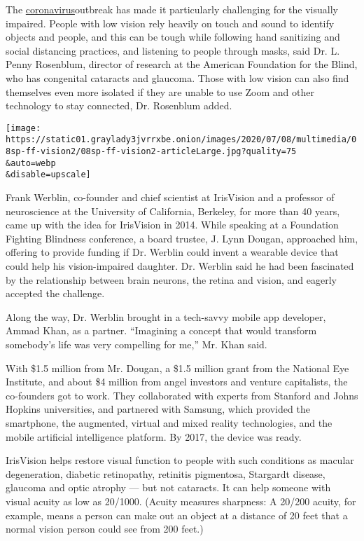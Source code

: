 The
\href{https://www.nytimes3xbfgragh.onion/news-event/coronavirus}{coronavirus}outbreak
has made it particularly challenging for the visually impaired. People
with low vision rely heavily on touch and sound to identify objects and
people, and this can be tough while following hand sanitizing and social
distancing practices, and listening to people through masks, said Dr. L.
Penny Rosenblum, director of research at the American Foundation for the
Blind, who has congenital cataracts and glaucoma. Those with low vision
can also find themselves even more isolated if they are unable to use
Zoom and other technology to stay connected, Dr. Rosenblum added.

\texttt{[image: https://static01.graylady3jvrrxbe.onion/images/2020/07/08/multimedia/08sp-ff-vision2/08sp-ff-vision2-articleLarge.jpg?quality=75\\\&auto=webp\\\&disable=upscale]}

Frank Werblin, co-founder and chief scientist at IrisVision and a
professor of neuroscience at the University of California, Berkeley, for
more than 40 years, came up with the idea for IrisVision in 2014. While
speaking at a Foundation Fighting Blindness conference, a board trustee,
J. Lynn Dougan, approached him, offering to provide funding if Dr.
Werblin could invent a wearable device that could help his
vision-impaired daughter. Dr. Werblin said he had been fascinated by the
relationship between brain neurons, the retina and vision, and eagerly
accepted the challenge.

Along the way, Dr. Werblin brought in a tech-savvy mobile app developer,
Ammad Khan, as a partner. ``Imagining a concept that would transform
somebody's life was very compelling for me,'' Mr. Khan said.

With \$1.5 million from Mr. Dougan, a \$1.5 million grant from the
National Eye Institute, and about \$4 million from angel investors and
venture capitalists, the co-founders got to work. They collaborated with
experts from Stanford and Johns Hopkins universities, and partnered with
Samsung, which provided the smartphone, the augmented, virtual and mixed
reality technologies, and the mobile artificial intelligence platform.
By 2017, the device was ready.

IrisVision helps restore visual function to people with such conditions
as macular degeneration, diabetic retinopathy, retinitis pigmentosa,
Stargardt disease, glaucoma and optic atrophy --- but not cataracts. It
can help someone with visual acuity as low as 20/1000. (Acuity measures
sharpness: A 20/200 acuity, for example, means a person can make out an
object at a distance of 20 feet that a normal vision person could see
from 200 feet.)

